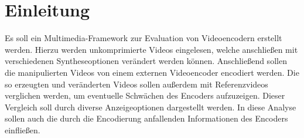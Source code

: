 \section{Einleitung}

Es soll ein Multimedia-Framework zur Evaluation von Videoencodern erstellt werden. Hierzu werden unkomprimierte Videos eingelesen, welche anschließen mit verschiedenen Syntheseoptionen verändert werden können. Anschließend sollen die manipulierten Videos von einem externen Videoencoder encodiert werden. Die so erzeugten und veränderten Videos sollen außerdem mit Referenzvideos verglichen werden, um eventuelle Schwächen des Encoders aufzuzeigen. Dieser Vergleich soll durch diverse Anzeigeoptionen dargestellt werden. In diese Analyse sollen auch die durch die Encodierung anfallenden Informationen des Encoders einfließen.

